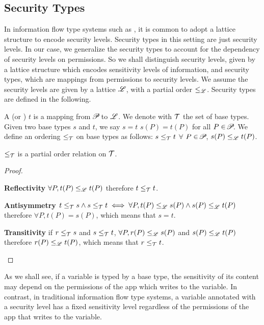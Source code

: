 { \subsection{Security Types}\label{sec:types}

In information flow type systems such as \cite{Volpano:1996}, it is common to adopt a lattice
structure to encode security levels. Security types in this setting are just security
levels. In our case, we generalize the security types to account for
the dependency of security levels on permissions. So we shall distinguish
security levels, given by a lattice structure which encodes sensitivity levels
of information, and security types, which are mappings from permissions to security levels.
We assume the security levels are given by a lattice $\mathscr{L}$, with a partial order $\leq_{\mathscr{L}}$.
Security types are defined in the following.

\begin{definition}\label{def:base_type}
A  (or ) $t$ is a mapping from $\!\mathscr{P}\!$ to $\mathscr{L}$.
We denote with $\mathcal{T}$ the set of base types.
Given two base types $s$ and $t$, we say $s=t$  $s(P)=t(P)$ for all  $P\in\!\mathscr{P}\!$.
We define an ordering $\leq_{\mathcal{T}}$ on base types as follows: 
$s\leq_{\mathcal{T}} t$  $\forall$ $P\in \!\mathscr{P}\!$, $s(P) \leq_{\mathscr{L}} t(P)$.
\end{definition}

\begin{lemma}\label{lem:tleq_po}
	$\leq_{\mathcal{T}}$ is a partial order relation on $\mathcal{T}$.
\end{lemma}
\begin{proof}
\begin{ProofEnumDesc}[style=standard]
	\item[\textbf{Reflectivity}] $\forall P, t(P)\leq_{\mathscr{L}} t(P)$ therefore $t\leq_{\mathcal{T}} t$.
	\item[\textbf{Antisymmetry}] $t\leq_{\mathcal{T}} s\wedge s\leq_{\mathcal{T}} t\iff \forall P, t(P)\leq_{\mathscr{L}} s(P)
\wedge s(P) \leq_{\mathscr{L}} t(P)$ therefore $\forall P, t(P)=s(P)$, which means that $s=t$.
	\item[\textbf{Transitivity}] if $r\leq_{\mathcal{T}} s$ and $s\leq_{\mathcal{T}} t$, $\forall P, r(P) \leq_{\mathscr{L}} s(P)$ and $s(P)\leq_{\mathscr{L}} t(P)$ therefore $r(P) \leq_{\mathscr{L}} t(P)$, which means that $r \leq_{\mathcal{T}} t$.
\end{ProofEnumDesc}
\end{proof}

As we shall see, if a variable is typed by a base type, the sensitivity of
its content may depend on the permissions of the app which writes to the variable.
In contrast, in traditional information flow type systems,
a variable annotated with a security level has a fixed sensitivity level
regardless of the permissions of the app that writes to the variable.

}
